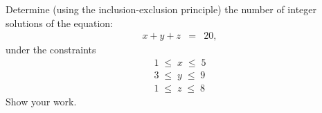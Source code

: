 
\begin{problem}
Determine (using the inclusion-exclusion principle)
the number of integer solutions of the equation:
%
\begin{eqnarray*}
x + y + z &=& 20,
\end{eqnarray*}
%
under the constraints 
%
\begin{eqnarray*}
        1 \;\le\; x \;\le\; 5 \\
        3 \;\le\; y \;\le\; 9 \\
        1\;\le\; z  \;\le\; 8
\end{eqnarray*}
%
Show your work.
\end{problem}

